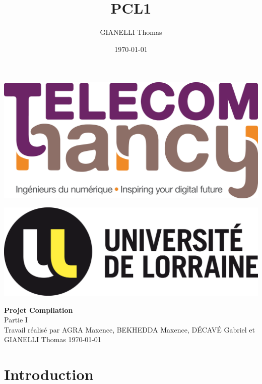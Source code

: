 \documentclass[11pt]{article}
\title{PCL1}
\author{GIANELLI Thomas}
\date{\today}
\begin{document}
\thispagestyle{empty}
\vspace*{-1.5cm}

\hspace{-1.5cm}\includegraphics[scale=0.2]{logo_tn.jpg}
	
\vspace*{-1.6cm}
	
\hspace{13.5cm}\includegraphics[scale=0.2]{logo_ul.png}



\vspace*{5cm}	%
\begin{center}	%
{\Huge \bf Projet Compilation \\\vspace{0.2cm} }	%
\vspace{3cm}
\Large Partie I \\
\vspace{3cm}
Travail réalisé par AGRA Maxence, BEKHEDDA Maxence, DÉCAVÉ Gabriel et GIANELLI Thomas
\vfill	%
\today
\end{center}
\newpage


\tableofcontents
\newpage

\section{Introduction}
\end{document}
